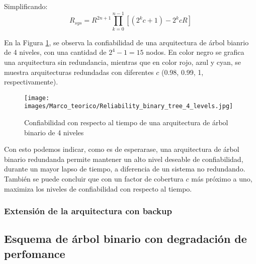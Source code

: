 Simplificando: $$R_{sys} = R^{2n +1} \prod_{k=0}^{n-1}{[(2^kc+1) - 2^kcR]}$$

En la Figura \ref{fig:Reliability_binary_tree_4_levels}, se observa la confiabilidad de una 
arquitectura de árbol bianrio de 4 niveles, con una cantidad de $2^4 -1 = 15$ nodos. En color negro 
se grafica una arquitectura sin redundancia, mientras que en color rojo, azul y cyan, se muestra 
arquitecturas redundadas con diferentes $c$ (0.98, 0.99, 1, respectivamente). 

\begin{figure}[h]
 \centering
 \texttt{[image: images/Marco\_teorico/Reliability\_binary\_tree\_4\_levels.jpg]}
  \caption{Confiabilidad con respecto al tiempo de una arquitectura de árbol binario de 4 niveles}  
\label{fig:Reliability_binary_tree_4_levels} 
\end{figure}

Con esto podemos indicar, como es de esperarase, una arquitectura de árbol binario redundanda 
permite mantener un alto nivel deseable de confiabilidad, durante un mayor lapso de tiempo, a 
diferencia de un sistema no redundando. También se puede concluir que con un factor de cobertura $c$
más próximo a uno, maximiza los niveles de confiabilidad con respecto al tiempo. 

\subsubsection{Extensión de la arquitectura con backup}

\subsection{Esquema de árbol binario con degradación de perfomance}
